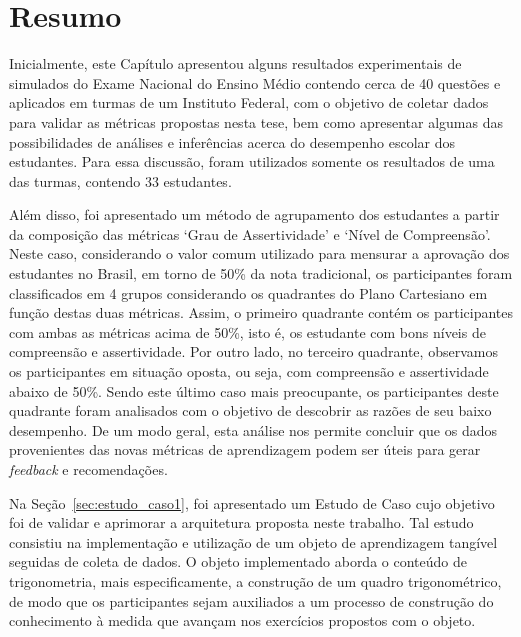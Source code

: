 \newpage
\section{Resumo}
\label{summary:PartialResults}

Inicialmente, este Capítulo apresentou alguns resultados experimentais de simulados do Exame Nacional do Ensino Médio contendo cerca de 40 questões e aplicados em turmas de um Instituto Federal, com o objetivo de coletar dados para validar as métricas propostas nesta tese, bem como apresentar algumas das possibilidades de análises e inferências acerca do desempenho escolar dos estudantes. Para essa discussão, foram utilizados somente os resultados de uma das turmas, contendo 33 estudantes.

Além disso, foi apresentado um método de agrupamento dos estudantes a partir da composição das métricas `Grau de Assertividade' e `Nível de Compreensão'. Neste caso, considerando o valor comum utilizado para mensurar a aprovação dos estudantes no Brasil, em torno de 50\% da nota tradicional, os participantes foram classificados em 4 grupos considerando os quadrantes do Plano Cartesiano em função destas duas métricas. Assim, o primeiro quadrante contém os participantes com ambas as métricas acima de 50\%, isto é, os estudante com bons níveis de compreensão e assertividade. Por outro lado, no terceiro quadrante, observamos os participantes em situação oposta, ou seja, com compreensão e assertividade abaixo de 50\%. Sendo este último caso mais preocupante, os participantes deste quadrante foram analisados com o objetivo de descobrir as razões de seu baixo desempenho. De um modo geral, esta análise nos permite concluir que os dados provenientes das novas métricas de aprendizagem podem ser úteis para gerar \textit{feedback} e recomendações.

Na Seção~\ref{sec:estudo_caso1}, foi apresentado um Estudo de Caso cujo objetivo foi de validar e aprimorar a arquitetura proposta neste trabalho. Tal estudo consistiu na implementação e utilização de um objeto de aprendizagem tangível seguidas de coleta de dados. O objeto implementado aborda o conteúdo de trigonometria, mais especificamente, a construção de um quadro trigonométrico, de modo que os participantes sejam auxiliados a um processo de construção do conhecimento à medida que avançam nos exercícios propostos com o objeto.

